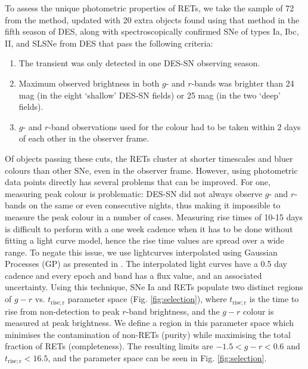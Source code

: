\documentclass[fleqn,usenatbib,]{mnras}
\begin{document}
To assess the unique photometric properties of RETs, we take the sample of 72 from the  method, updated with 20 extra objects found using that method in the fifth season of DES, along with spectroscopically confirmed SNe of types Ia, Ibc, II, and SLSNe from DES that pass the following criteria:
\begin{enumerate}
\item The transient was only detected in one DES-SN observing season.
\item Maximum observed brightness in both $g$- and $r$-bands was brighter than 24 mag (in the eight `shallow' DES-SN fields) or 25 mag (in the two `deep' fields).
\item $g$- and $r$-band observations used for the colour had to be taken within 2 days of each other in the observer frame.
\end{enumerate}

Of objects passing these cuts, the RETs cluster at shorter timescales and bluer colours than other SNe, even in the observer frame. However, using photometric data points directly has several problems that can be improved. For one, measuring peak colour is problematic: DES-SN did not always observe $g$- and $r$-bands on the same or even consecutive nights, thus making it impossible to measure the peak colour in a number of cases. Measuring rise times of 10-15 days is difficult to perform with a one week cadence when it has to be done without fitting a light curve model, hence the rise time values are spread over a wide range. To negate this issue, we use lightcurves interpolated using Gaussian Processes (GP) as presented in . The interpolated light curves have a 0.5 day cadence and every epoch and band has a flux value, and an associated uncertainty. Using this technique, SNe Ia and RETs populate two distinct regions of $g-r$ vs. $t_{\mathrm{rise; r}}$ parameter space (Fig. \ref{fig:selection}), where $t_{\mathrm{rise; r}}$ is the time to rise from non-detection to peak $r$-band brightness, and the $g-r$ colour is measured at peak brightness. We define a region in this parameter space which minimises the contamination of non-RETs (purity) while maximising the total fraction of RETs (completeness). The resulting limits are $-1.5 < g-r < 0.6 $ and $t_{\mathrm{rise; r}} <16.5$, and the parameter space can be seen in Fig. \ref{fig:selection}.
\end{document}

